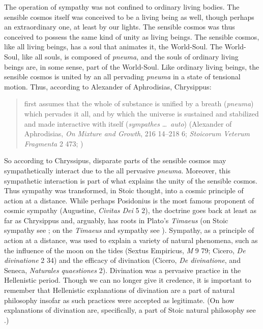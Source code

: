 The operation of sympathy was not confined to ordinary living bodies. The sensible cosmos itself was conceived to be a living being as well, though perhaps an extraordinary one, at least by our lights. The sensible cosmos was thus conceived to possess the same kind of unity as living beings. The sensible cosmos, like all living beings, has a soul that animates it, the World-Soul. The World-Soul, like all souls, is composed of \emph{pneuma}, and the souls of ordinary living beings are, in some sense, part of the World-Soul. Like ordinary living beings, the sensible cosmos is united by an all pervading \emph{pneuma} in a state of tensional motion. Thus, according to Alexander of Aphrodisias, Chrysippus: 
\begin{quote}
	first assumes that the whole of substance is unified by a breath (\emph{pneuma}) which pervades it all, and by which the universe is sustained and stabilized and made interactive with itself (\emph{sympathes} \ldots\ \emph{auto}) (Alexander of Aphrodisias, \emph{On Mixture and Growth}, 216 14--218 6; \emph{Stoicorum Veterum Fragmenta} 2 473; \citealt[48 C]{Long:1987aa})
\end{quote}
So according to Chryssipus, disparate parts of the sensible cosmos may sympathetically interact due to the all pervasive \emph{pneuma}. Moreover, this sympathetic interaction is part of what explains the unity of the sensible cosmos. Thus sympathy was transformed, in Stoic thought, into a cosmic principle of action at a distance. While perhaps Posidonius is the most famous proponent of cosmic sympathy (Augustine, \emph{Civitas Dei} 5 2), the doctrine goes back at least as far as Chrysippus and, arguably, has roots in Plato's \emph{Timaeus} (on Stoic sympathy see \citealt{Sambursky:1959ms,Meyer:2009xp,Brouwer:2015ee}; on the \emph{Timaeus} and sympathy see \citealt{Emilsson:2015wf}). Sympathy, as a principle of action at a distance, was used to explain a variety of natural phenomena, such as the influence of the moon on the tides (Sextus Empiricus, \emph{M} 9 79; Cicero, \emph{De divinatione} 2 34) and the efficacy of divination (Cicero, \emph{De divinatione}, and Seneca, \emph{Naturales quaestiones} 2). Divination was a pervasive practice in the Hellenistic period. Though we can no longer give it credence, it is important to remember that Hellenistic explanations of divination are a part of natural philosophy insofar as such practices were accepted as legitimate. (On how explanations of divination are, specifically, a part of Stoic natural philosophy see \citealt{Struck:2007aa}.)

